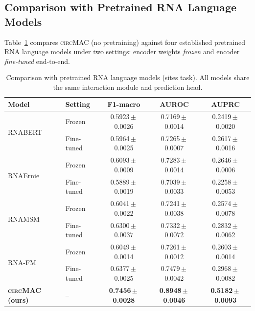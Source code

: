 \documentclass[11pt]{article}
\newcommand{\model}{\textsc{circMAC}}
\newcommand{\best}[1]{\textbf{#1}}
\newcommand{\spm}{\,\ensuremath{\pm}\,}
\begin{document}
\subsection{Comparison with Pretrained RNA Language Models}
\label{sec:rna_lm}

Table~\ref{tab:rna_lm} compares \model{} (no pretraining) against four
established pretrained RNA language models under two settings:
encoder weights \textit{frozen} and encoder \textit{fine-tuned} end-to-end.

\begin{table}[htbp]
\centering
\caption{Comparison with pretrained RNA language models (sites task).
         All models share the same interaction module and prediction head.}
\label{tab:rna_lm}
\renewcommand{\arraystretch}{1.15}
\begin{tabular}{llccc}
\toprule
\textbf{Model} & \textbf{Setting} & \textbf{F1-macro} & \textbf{AUROC} & \textbf{AUPRC} \\
\midrule
\multirow{2}{*}{RNABERT~\cite{rnabert}}
  & Frozen      & 0.5923\spm 0.0026 & 0.7169\spm 0.0014 & 0.2419\spm 0.0020 \\
  & Fine-tuned  & 0.5964\spm 0.0025 & 0.7265\spm 0.0007 & 0.2617\spm 0.0016 \\
\multirow{2}{*}{RNAErnie~\cite{rnaernie}}
  & Frozen      & 0.6093\spm 0.0009 & 0.7283\spm 0.0014 & 0.2646\spm 0.0006 \\
  & Fine-tuned  & 0.5889\spm 0.0019 & 0.7039\spm 0.0033 & 0.2258\spm 0.0053 \\
\multirow{2}{*}{RNAMSM~\cite{rnamsm}}
  & Frozen      & 0.6041\spm 0.0022 & 0.7241\spm 0.0038 & 0.2574\spm 0.0078 \\
  & Fine-tuned  & 0.6300\spm 0.0037 & 0.7332\spm 0.0072 & 0.2832\spm 0.0062 \\
\multirow{2}{*}{RNA-FM~\cite{rnafm}}
  & Frozen      & 0.6049\spm 0.0014 & 0.7261\spm 0.0012 & 0.2603\spm 0.0014 \\
  & Fine-tuned  & 0.6377\spm 0.0025 & 0.7479\spm 0.0042 & 0.2968\spm 0.0082 \\
\midrule
\textbf{\model{} (ours)} & -- & \best{0.7456\spm 0.0028} & \best{0.8948\spm 0.0046} & \best{0.5182\spm 0.0093} \\
\bottomrule
\end{tabular}
\end{table}
\end{document}
